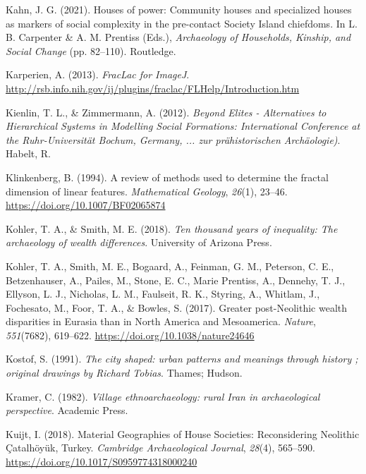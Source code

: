 \documentclass[
  12pt,
]{book}
\newlength{\cslhangindent}
\newlength{\cslentryspacingunit} %
\newenvironment{CSLReferences}[2] %
 {%
  \setlength{\parindent}{0pt}
  \ifodd #1
  \let\oldpar\par
  \def\par{\hangindent=\cslhangindent\oldpar}
  \fi
  \setlength{\parskip}{#2\cslentryspacingunit}
 }%
 {}
\begin{document}
\begin{CSLReferences}{1}{0}
\leavevmode{}%
Kahn, J. G. (2021). Houses of power: {Community} houses and specialized houses as markers of social complexity in the pre-contact {Society Island} chiefdoms. In L. B. Carpenter \& A. M. Prentiss (Eds.), \emph{Archaeology of {Households}, {Kinship}, and {Social Change}} (pp. 82--110). {Routledge}.

\leavevmode{}%
Karperien, A. (2013). \emph{FracLac for ImageJ}. \url{http://rsb.info.nih.gov/ij/plugins/fraclac/FLHelp/Introduction.htm}

\leavevmode{}%
Kienlin, T. L., \& Zimmermann, A. (2012). \emph{Beyond Elites - Alternatives to Hierarchical Systems in Modelling Social Formations: International Conference at the Ruhr-Universität Bochum, Germany, ... zur prähistorischen Archäologie)}. Habelt, R.

\leavevmode{}%
Klinkenberg, B. (1994). A review of methods used to determine the fractal dimension of linear features. \emph{Mathematical Geology}, \emph{26}(1), 23--46. \url{https://doi.org/10.1007/BF02065874}

\leavevmode{}%
Kohler, T. A., \& Smith, M. E. (2018). \emph{Ten thousand years of inequality: The archaeology of wealth differences}. University of Arizona Press.

\leavevmode{}%
Kohler, T. A., Smith, M. E., Bogaard, A., Feinman, G. M., Peterson, C. E., Betzenhauser, A., Pailes, M., Stone, E. C., Marie Prentiss, A., Dennehy, T. J., Ellyson, L. J., Nicholas, L. M., Faulseit, R. K., Styring, A., Whitlam, J., Fochesato, M., Foor, T. A., \& Bowles, S. (2017). Greater post-Neolithic wealth disparities in Eurasia than in North America and Mesoamerica. \emph{Nature}, \emph{551}(7682), 619--622. \url{https://doi.org/10.1038/nature24646}

\leavevmode{}%
Kostof, S. (1991). \emph{The city shaped: urban patterns and meanings through history ; original drawings by Richard Tobias}. Thames; Hudson.

\leavevmode{}%
Kramer, C. (1982). \emph{Village ethnoarchaeology: rural Iran in archaeological perspective}. Academic Press.

\leavevmode{}%
Kuijt, I. (2018). Material Geographies of House Societies: Reconsidering Neolithic Çatalhöyük, Turkey. \emph{Cambridge Archaeological Journal}, \emph{28}(4), 565--590. \url{https://doi.org/10.1017/S0959774318000240}


\end{CSLReferences}
\end{document}
